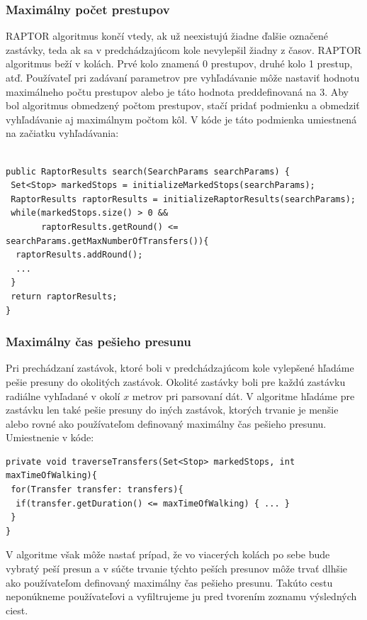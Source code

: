 \subsubsection{Maximálny počet prestupov}
RAPTOR algoritmus končí vtedy, ak už neexistujú žiadne ďalšie označené zastávky, teda ak sa v predchádzajúcom kole nevylepšil žiadny z časov. RAPTOR algoritmus beží v kolách. Prvé kolo znamená 0 prestupov, druhé kolo 1 prestup, atď. Používateľ pri zadávaní parametrov pre vyhľadávanie môže nastaviť hodnotu maximálneho počtu prestupov alebo je táto hodnota preddefinovaná na $3$. Aby bol algoritmus obmedzený počtom prestupov, stačí pridať podmienku a obmedziť vyhľadávanie aj maximálnym počtom kôl. V kóde je táto podmienka umiestnená na začiatku vyhľadávania:\\ \\
\begin{lstlisting} 
public RaptorResults search(SearchParams searchParams) {
 Set<Stop> markedStops = initializeMarkedStops(searchParams);
 RaptorResults raptorResults = initializeRaptorResults(searchParams);
 while(markedStops.size() > 0 && 
       raptorResults.getRound() <= searchParams.getMaxNumberOfTransfers()){   
  raptorResults.addRound();     
  ...
 }
 return raptorResults;
}
\end{lstlisting}

\subsubsection{Maximálny čas pešieho presunu}
Pri prechádzaní zastávok, ktoré boli v predchádzajúcom kole vylepšené hľadáme pešie presuny do okolitých zastávok. Okolité zastávky boli pre každú zastávku radiálne vyhľadané v okolí $x$ metrov pri parsovaní dát. V algoritme hľadáme pre zastávku len také pešie presuny do iných zastávok, ktorých trvanie je menšie alebo rovné ako používateľom definovaný maximálny čas pešieho presunu. Umiestnenie v kóde:
\begin{lstlisting}
private void traverseTransfers(Set<Stop> markedStops, int maxTimeOfWalking){
 for(Transfer transfer: transfers){
  if(transfer.getDuration() <= maxTimeOfWalking) { ... }
 }
}
\end{lstlisting} 

V algoritme však môže nastať prípad, že vo viacerých kolách po sebe bude vybratý peší presun a v súčte trvanie týchto peších presunov môže trvať dlhšie ako používateľom definovaný maximálny čas pešieho presunu.
Takúto cestu neponúkneme používateľovi a vyfiltrujeme ju pred tvorením zoznamu výsledných ciest.

